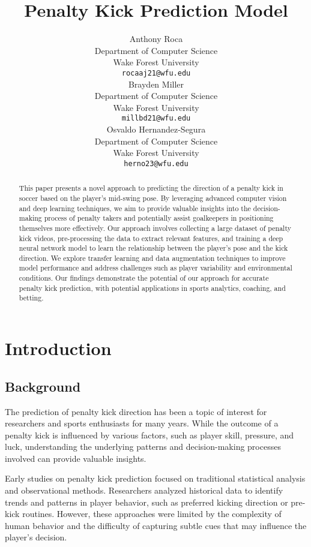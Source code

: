 \documentclass{article}
\title{Penalty Kick Prediction Model}
\author{%
    Anthony Roca\\
    Department of Computer Science\\
    Wake Forest University\\
    \texttt{rocaaj21@wfu.edu} \\
    \AND 
    Brayden Miller\\
    Department of Computer Science\\
    Wake Forest University\\
    \texttt{millbd21@wfu.edu} \\
    \AND
    Osvaldo Hernandez-Segura\\
    Department of Computer Science\\
    Wake Forest University\\
    \texttt{herno23@wfu.edu} \\  
}
\begin{document}
\maketitle

\begin{abstract} 
  This paper presents a novel approach to predicting the direction of a penalty kick in soccer based on the player's mid-swing pose. By leveraging advanced computer vision and deep learning techniques, we aim to provide valuable insights into the decision-making process of penalty takers and potentially assist goalkeepers in positioning themselves more effectively. Our approach involves collecting a large dataset of penalty kick videos, pre-processing the data to extract relevant features, and training a deep neural network model to learn the relationship between the player's pose and the kick direction. We explore transfer learning and data augmentation techniques to improve model performance and address challenges such as player variability and environmental conditions. Our findings demonstrate the potential of our approach for accurate penalty kick prediction, with potential applications in sports analytics, coaching, and betting.
\end{abstract}


\section{Introduction}

\subsection{Background}

The prediction of penalty kick direction has been a topic of interest for researchers and sports enthusiasts for many years. While the outcome of a penalty kick is influenced by various factors, such as player skill, pressure, and luck, understanding the underlying patterns and decision-making processes involved can provide valuable insights.

Early studies on penalty kick prediction focused on traditional statistical analysis and observational methods. Researchers analyzed historical data to identify trends and patterns in player behavior, such as preferred kicking direction or pre-kick routines. However, these approaches were limited by the complexity of human behavior and the difficulty of capturing subtle cues that may influence the player's decision.
\end{document}
